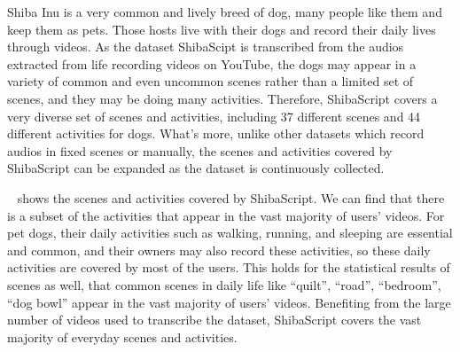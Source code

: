 Shiba Inu is a very common and lively breed of dog, many people like them and keep them as pets. Those hosts live with their dogs and record their daily lives through videos. As the dataset ShibaScipt is transcribed from the audios extracted from life recording videos on YouTube, the dogs may appear in a variety of common and even uncommon scenes rather than a limited set of scenes, and they may be doing many activities. Therefore, ShibaScript covers a very diverse set of scenes and activities, including 37 different scenes and 44 different activities for dogs. What's more, unlike other datasets which record audios in fixed scenes or manually, the scenes and activities covered by ShibaScript can be expanded as the dataset is continuously collected.

~ shows the scenes and activities covered by ShibaScript. We can find that there is a subset of the activities that appear in the vast majority of users' videos. For pet dogs, their daily activities such as walking, running, and sleeping are essential and common, and their owners may also record these activities, so these daily activities are covered by most of the users. This holds for the statistical results of scenes as well, that common scenes in daily life like ``quilt'', ``road'', ``bedroom'', ``dog bowl'' appear in the vast majority of users' videos. Benefiting from the large number of videos used to transcribe the dataset, ShibaScript covers the vast majority of everyday scenes and activities.

